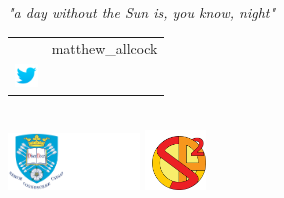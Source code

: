 \documentclass{beamer}
\begin{document}
\begin{frame}
\centering
\emph{"a day without the Sun is, you know, night"}
\\
\vspace*{0.4in}
\large
\begin{tabular}{lr}
& \vspace*{-0.23in} \hspace*{-0.15in} matthew\_allcock \\
\includegraphics[height=0.6cm]{media/twitter-icon.png} &
\end{tabular}
\\
\vspace*{0.4in}
\includegraphics[height=1.5cm]{media/logo-sheffield-2.png}
\hspace*{0.3in}
\includegraphics[height=1.6cm]{media/sp2rc_logo2.png}
\end{frame}
\end{document}
